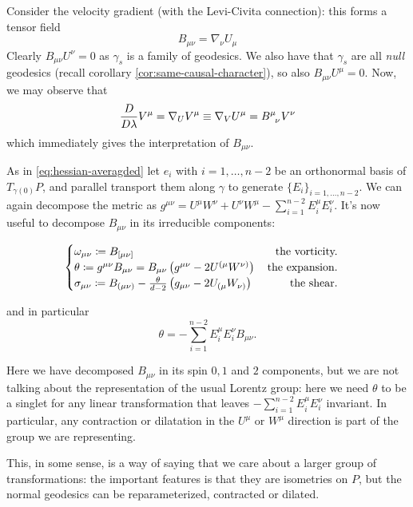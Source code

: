 	Consider the velocity gradient (with the Levi-Civita connection): this forms a tensor field
	\[
	B_{\mu\nu} = \nabla_{\nu}U_{\mu}
	\]
	Clearly \(B_{\mu\nu}U^{\nu} = 0\) as \(\gamma_s\) is a family of geodesics. We also have that \(\gamma_s\) are all \emph{null} geodesics (recall corollary \ref{cor:same-causal-character}), so also \(B_{\mu\nu}U^{\mu} = 0\). Now, we may observe that
	\[
	\frac{D}{D\lambda} V^{\mu} = \nabla_U V^{\mu} \equiv \nabla_V U^{\mu} = B\indices{^{\mu}_{\nu}} V^{\nu}
	\]
	which immediately gives the interpretation of \(B_{\mu\nu}\).
	
	As in \ref{eq:hessian-averagded} let \(e_i\) with \(i = 1, \ldots, n - 2\) be an orthonormal basis of \(T_{\gamma(0)}P\), and parallel transport them along \(\gamma\) to generate \(\{E_i\}_{i = 1, \ldots, n-2}\). We can again decompose the metric as \(g^{\mu\nu} = U^{\mu}W^{\nu} + U^{\nu}W^{\mu} - \sum_{i=1}^{n - 2}E_i^{\mu}E_i^{\nu}\). It's now useful to decompose \(B_{\mu\nu}\) in its irreducible components:
	
	\begin{equation}
	\label{eq:def-expansion-vorticity-shear}
		\begin{cases}
		\omega_{\mu\nu} \coloneqq B_{[\mu\nu]} \hfill \text{the vorticity.} \\
		\theta \coloneqq g^{\mu\nu}B_{\mu\nu}  = B_{\mu\nu} \left(g^{\mu\nu} - 2U^{(\mu}W^{\nu)}\right) \hfill \quad \text{the expansion.} \\
		\sigma_{\mu\nu} \coloneqq B_{(\mu\nu)} - \frac{\theta}{d - 2}\left(g_{\mu\nu} - 2U_{(\mu}W_{\nu)}\right) \hfill \quad \text{ the shear.}
		\end{cases}
	\end{equation}
	
	and in particular
	\[
	\theta = - \sum_{i=1}^{n - 2}E_i^{\mu}E_i^{\nu} B_{\mu\nu}.
	\]
	\begin{remark}
		Here we have decomposed \(B_{\mu\nu}\) in its spin \(0, 1\) and \(2\) components, but we are not talking about the representation of the usual Lorentz group: here we need \(\theta\) to be a singlet for any linear transformation that leaves \(- \sum_{i=1}^{n - 2}E_i^{\mu}E_i^{\nu}\) invariant. In particular, any contraction or dilatation in the \(U^{\mu}\) or \(W^{\mu}\) direction is part of the group we are representing.
		
		This, in some sense, is a way of saying that we care about a larger group of transformations: the important features is that they are isometries on \(P\), but the normal geodesics can be reparameterized, contracted or dilated.
	\end{remark}
	
